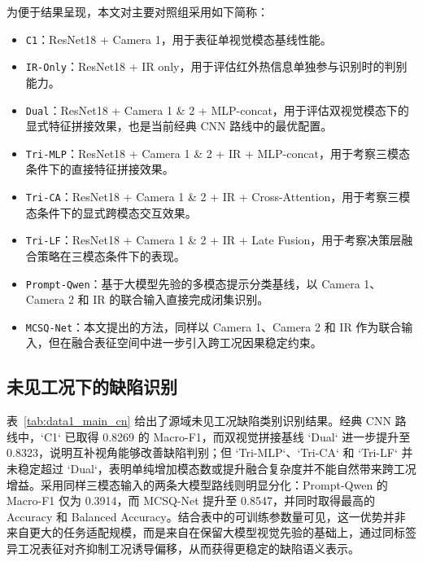 \documentclass[journal]{IEEEtran}
\begin{document}
为便于结果呈现，本文对主要对照组采用如下简称：
\begin{itemize}
\item \texttt{C1}：ResNet18 + Camera 1，用于表征单视觉模态基线性能。
\item \texttt{IR-Only}：ResNet18 + IR only，用于评估红外热信息单独参与识别时的判别能力。
\item \texttt{Dual}：ResNet18 + Camera 1 \& 2 + MLP-concat，用于评估双视觉模态下的显式特征拼接效果，也是当前经典 CNN 路线中的最优配置。
\item \texttt{Tri-MLP}：ResNet18 + Camera 1 \& 2 + IR + MLP-concat，用于考察三模态条件下的直接特征拼接效果。
\item \texttt{Tri-CA}：ResNet18 + Camera 1 \& 2 + IR + Cross-Attention，用于考察三模态条件下的显式跨模态交互效果。
\item \texttt{Tri-LF}：ResNet18 + Camera 1 \& 2 + IR + Late Fusion，用于考察决策层融合策略在三模态条件下的表现。
\item \texttt{Prompt-Qwen}：基于大模型先验的多模态提示分类基线，以 Camera 1、Camera 2 和 IR 的联合输入直接完成闭集识别。
\item \texttt{MCSQ-Net}：本文提出的方法，同样以 Camera 1、Camera 2 和 IR 作为联合输入，但在融合表征空间中进一步引入跨工况因果稳定约束。
\end{itemize}

\subsection{未见工况下的缺陷识别}
表~\ref{tab:data1_main_cn} 给出了源域未见工况缺陷类别识别结果。经典 CNN 路线中，`C1` 已取得 0.8269 的 Macro-F1，而双视觉拼接基线 `Dual` 进一步提升至 0.8323，说明互补视角能够改善缺陷判别；但 `Tri-MLP`、`Tri-CA` 和 `Tri-LF` 并未稳定超过 `Dual`，表明单纯增加模态数或提升融合复杂度并不能自然带来跨工况增益。采用同样三模态输入的两条大模型路线则明显分化：Prompt-Qwen 的 Macro-F1 仅为 0.3914，而 MCSQ-Net 提升至 0.8547，并同时取得最高的 Accuracy 和 Balanced Accuracy。结合表中的可训练参数量可见，这一优势并非来自更大的任务适配规模，而是来自在保留大模型视觉先验的基础上，通过同标签异工况表征对齐抑制工况诱导偏移，从而获得更稳定的缺陷语义表示。
\end{document}
